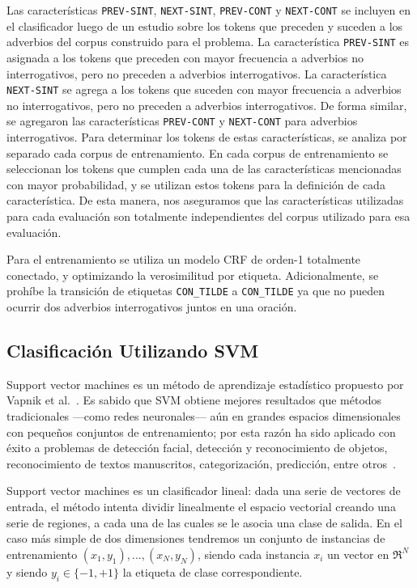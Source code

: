 \documentclass[runningheads,a4paper]{llncs}
\begin{document}
Las características \texttt{\small PREV-SINT}, \texttt{\small NEXT-SINT}, \texttt{\small PREV-CONT} y \texttt{\small NEXT-CONT} se incluyen en el clasificador luego de un estudio sobre los tokens que preceden y suceden a los adverbios del corpus construido para el problema. La característica \texttt{\small PREV-SINT} es asignada a los tokens que preceden con mayor frecuencia a adverbios no interrogativos, pero no preceden a adverbios interrogativos. La característica \texttt{\small NEXT-SINT} se agrega a los tokens que suceden con mayor frecuencia a adverbios no interrogativos, pero no preceden a adverbios interrogativos. De forma similar, se agregaron las características \texttt{\small PREV-CONT} y \texttt{\small NEXT-CONT} para adverbios interrogativos. Para determinar los tokens de estas características, se analiza por separado cada corpus de entrenamiento. En cada corpus de entrenamiento se seleccionan los tokens que cumplen cada una de las características mencionadas con mayor probabilidad, y se utilizan estos tokens para la definición de cada característica. De esta manera, nos aseguramos que las características utilizadas para cada evaluación son totalmente independientes del corpus utilizado para esa evaluación.

Para el entrenamiento se utiliza un modelo CRF de orden-1 totalmente conectado, y optimizando la verosimilitud por etiqueta. Adicionalmente, se prohíbe la transición de etiquetas \texttt{\small CON\_TILDE} a \texttt{\small CON\_TILDE} ya que no pueden ocurrir dos adverbios interrogativos juntos en una oración. 

\subsection{Clasificación Utilizando SVM}
\label{sec:SVM}

Support vector machines es un método de aprendizaje estadístico propuesto por Vapnik et al.~\cite{CORTES95}. Es sabido que SVM obtiene mejores resultados que métodos tradicionales ---como redes neuronales--- aún en grandes espacios dimensionales con pequeños conjuntos de entrenamiento; por esta razón ha sido aplicado con éxito a problemas de detección facial, detección y reconocimiento de objetos, reconocimiento de textos manuscritos, categorización, predicción, entre otros~\cite{BYUN02}. 

Support vector machines es un clasificador lineal: dada una serie de vectores de entrada, el m\'etodo intenta dividir linealmente el espacio vectorial creando una serie de regiones, a cada una de las cuales se le asocia una clase de salida. En el caso más simple de dos dimensiones tendremos un conjunto de instancias de entrenamiento ${(x_1, y_1),...,(x_N,y_N)}$, siendo cada instancia $x_i$ un vector en $\Re^N$ y siendo $y_i \in \lbrace-1,+1\rbrace$ la etiqueta de clase correspondiente. 
\end{document}
